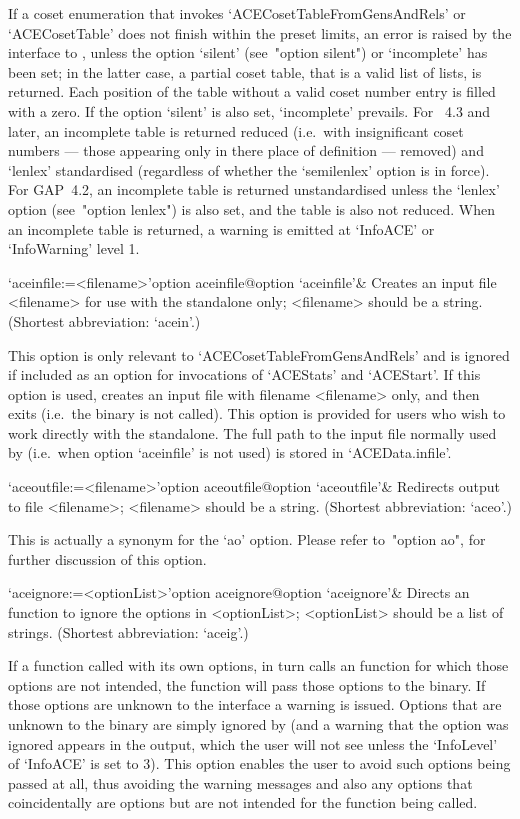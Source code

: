 If a coset enumeration that invokes `ACECosetTableFromGensAndRels'  or
`ACECosetTable' does not finish within the preset limits, an error  is
raised  by  the  interface  to  {\GAP},  unless  the  option  `silent'
(see~"option silent") or `incomplete' has  been  set;  in  the  latter
case, a partial coset table, that is a valid {\GAP} list of lists,  is
returned. Each position of the table  without  a  valid  coset  number
entry is filled with a zero. If  the  option  `silent'  is  also  set,
`incomplete' prevails. For {\GAP}~4.3 and later, an  incomplete  table
is returned reduced (i.e.~with insignificant coset numbers  ---  those
appearing only in there place of definition --- removed) and  `lenlex'
standardised (regardless of whether  the  `semilenlex'  option  is  in
force). For GAP~4.2, an incomplete table  is  returned  unstandardised
unless the `lenlex' option (see~"option lenlex") is also set, and  the
table is also not reduced. When an incomplete  table  is  returned,  a
warning is emitted at `InfoACE' or `InfoWarning' level 1.

\>`aceinfile:=<filename>'{option aceinfile}@{option `aceinfile'}&
Creates an {\ACE} input file <filename> for use  with  the  standalone
only; <filename> should be a string. (Shortest abbreviation: `acein'.)

This option is only relevant to `ACECosetTableFromGensAndRels' and  is
ignored if included as an option for  invocations  of  `ACEStats'  and
`ACEStart'. If this option is used, {\GAP} creates an input file  with
filename <filename> only, and then exits (i.e.~the  {\ACE}  binary  is
not called). This option is  provided  for  users  who  wish  to  work
directly with the {\ACE} standalone. The full path to the  input  file
normally used by {\ACE} (i.e.~when option `aceinfile' is not used)  is
stored in `ACEData.infile'.


\>`aceoutfile:=<filename>'{option aceoutfile}@{option `aceoutfile'}&
Redirects {\ACE} output to file <filename>;  <filename>  should  be  a
string. (Shortest abbreviation: `aceo'.)

This  is  actually  a  synonym  for  the  `ao'  option.  Please  refer
to~"option ao", for further discussion of this option.

\>`aceignore:=<optionList>'{option aceignore}@{option `aceignore'}&
Directs an {\ACE} function to  ignore  the  options  in  <optionList>;
<optionList> should be a list of strings.
(Shortest abbreviation: `aceig'.)

If a function called with its own options, in  turn  calls  an  {\ACE}
function for which those options are not intended, the {\ACE} function
will pass those options to the {\ACE} binary.  If  those  options  are
unknown to the {\ACE} interface a warning is issued. Options that  are
unknown to the {\ACE} binary are  simply  ignored  by  {\ACE}  (and  a
warning that the option was ignored  appears  in  the  {\ACE}  output,
which the user will not see unless the `InfoLevel' of `InfoACE' is set
to 3). This option enables the user to avoid such options being passed
at all, thus avoiding the warning messages and also any  options  that
coincidentally are {\ACE} options but are not intended for the  {\ACE}
function being called.

